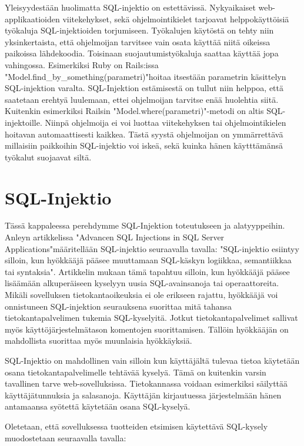 \documentclass[finnish]{tktltiki2}
\theoremstyle{definition}
\theoremstyle{remark}
\begin{document}
	Yleisyydestään huolimatta SQL-injektio on estettävissä. Nykyaikaiset web-applikaatioiden viitekehykset, sekä ohjelmointikielet tarjoavat helppokäyttöisiä työkaluja SQL-injektioiden torjumiseen. Työkalujen käytöstä on tehty niin yksinkertaista, että ohjelmoijan tarvitsee vain osata käyttää niitä oikeissa paikoissa lähdekoodia. Toisinaan suojautumistyökaluja saattaa käyttää jopa vahingossa. Esimerkiksi Ruby on Rails:issa  "Model.find\_by\_something(p\linebreak arametri)"\space hoitaa itsestään parametrin käsittelyn SQL-injektion varalta. SQL-Injektion estämisestä on tullut niin helppoa, että saatetaan erehtyä luulemaan, ettei ohjelmoijan tarvitse enää huolehtia siitä. Kuitenkin esimerkiksi Railsin "Model.where(parametri)"\space -metodi on altis SQL-injektoille. Niinpä ohjelmoija ei voi luottaa viitekehyksen tai ohjelmointikielen hoitavan automaattisesti kaikkea. Tästä syystä ohjelmoijan on ymmärrettävä millaisiin paikkoihin SQL-injektio voi iskeä, sekä kuinka hänen käytttämänsä työkalut suojaavat siltä.
	
	
	\section{SQL-Injektio}
	Tässä kappaleessa perehdymme SQL-Injektion toteutukseen ja alatyyppeihin. Anleyn artikkelissa "Advancen SQL Injections in SQL Server Applications"\space\cite{definition}\space määritellään SQL-injektio seuraavalla tavalla: "SQL-injektio esiintyy silloin, kun hyökkääjä pääsee muuttamaan SQL-käskyn logiikkaa, semantiikkaa tai syntaksia". Artikkelin mukaan tämä tapahtuu silloin, kun hyökkääjä pääsee lisäämään alkuperäiseen kyselyyn uusia SQL-avainsanoja tai operaattoreita.
	Mikäli sovelluksen tietokantaoikeuksia ei ole erikseen rajattu, hyökkääjä voi onnistuneen SQL-injektion seurauksena suorittaa mitä tahansa tietokantapalvelimen tukemia SQL-kyselyitä. Jotkut tietokantapalvelimet sallivat myös käyttöjärjestelmätason komentojen suorittamisen. Tällöin hyökkääjän on mahdollista suorittaa myös muunlaisia hyökkäyksiä. 
	
	SQL-Injektio on mahdollinen vain silloin kun käyttäjältä tulevaa tietoa käytetään osana tietokantapalvelimelle tehtävää kyselyä. Tämä on kuitenkin varsin tavallinen tarve web-sovelluksissa. Tietokannassa voidaan esimerkiksi säilyttää käyttäjätunnuksia ja salasanoja. Käyttäjän kirjautuessa järjestelmään hänen antamaansa syötettä käytetään osana SQL-kyselyä.
	
 Oletetaan, että sovelluksessa tuotteiden etsimisen käytettävä SQL-kysely muodostetaan seuraavalla tavalla:
 
\end{document}
